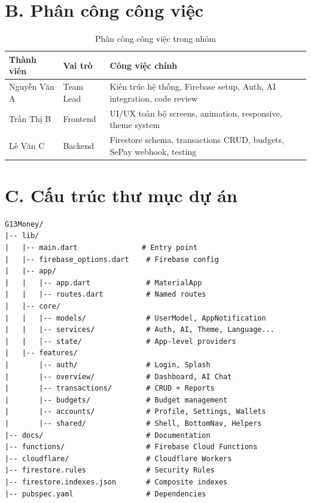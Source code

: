 \section*{B. Phân công công việc}

\begin{table}[H]
\centering
\caption{Phân công công việc trong nhóm}
\begin{tabularx}{\textwidth}{|l|l|X|}
\hline
\textbf{Thành viên} & \textbf{Vai trò} & \textbf{Công việc chính} \\
\hline
Nguyễn Văn A & Team Lead & Kiến trúc hệ thống, Firebase setup, Auth, AI integration, code review \\
\hline
Trần Thị B & Frontend & UI/UX toàn bộ screens, animation, responsive, theme system \\
\hline
Lê Văn C & Backend & Firestore schema, transactions CRUD, budgets, SePay webhook, testing \\
\hline
\end{tabularx}
\end{table}

\section*{C. Cấu trúc thư mục dự án}

\begin{lstlisting}[basicstyle=\ttfamily\footnotesize, frame=single, caption={Cấu trúc thư mục chính}]
G13Money/
|-- lib/
|   |-- main.dart               # Entry point
|   |-- firebase_options.dart    # Firebase config
|   |-- app/
|   |   |-- app.dart             # MaterialApp
|   |   |-- routes.dart          # Named routes
|   |-- core/
|   |   |-- models/              # UserModel, AppNotification
|   |   |-- services/            # Auth, AI, Theme, Language...
|   |   |-- state/               # App-level providers
|   |-- features/
|       |-- auth/                # Login, Splash
|       |-- overview/            # Dashboard, AI Chat
|       |-- transactions/        # CRUD + Reports
|       |-- budgets/             # Budget management
|       |-- accounts/            # Profile, Settings, Wallets
|       |-- shared/              # Shell, BottomNav, Helpers
|-- docs/                        # Documentation
|-- functions/                   # Firebase Cloud Functions
|-- cloudflare/                  # Cloudflare Workers
|-- firestore.rules              # Security Rules
|-- firestore.indexes.json       # Composite indexes
|-- pubspec.yaml                 # Dependencies
\end{lstlisting}

